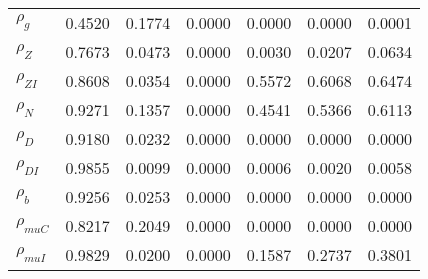 \begin{center}
\begin{longtable}{lcccccc}
$ {\rho_g}             $	 & 	          0.4520	 & 	          0.1774	 & 	          0.0000	 & 	          0.0000	 & 	          0.0000	 & 	          0.0001 \\ 
$ {\rho_Z}             $	 & 	          0.7673	 & 	          0.0473	 & 	          0.0000	 & 	          0.0030	 & 	          0.0207	 & 	          0.0634 \\ 
$ {\rho_{ZI}}          $	 & 	          0.8608	 & 	          0.0354	 & 	          0.0000	 & 	          0.5572	 & 	          0.6068	 & 	          0.6474 \\ 
$ {\rho_N}             $	 & 	          0.9271	 & 	          0.1357	 & 	          0.0000	 & 	          0.4541	 & 	          0.5366	 & 	          0.6113 \\ 
$ {\rho_D}             $	 & 	          0.9180	 & 	          0.0232	 & 	          0.0000	 & 	          0.0000	 & 	          0.0000	 & 	          0.0000 \\ 
$ {\rho_{DI}}          $	 & 	          0.9855	 & 	          0.0099	 & 	          0.0000	 & 	          0.0006	 & 	          0.0020	 & 	          0.0058 \\ 
$ {\rho_b}             $	 & 	          0.9256	 & 	          0.0253	 & 	          0.0000	 & 	          0.0000	 & 	          0.0000	 & 	          0.0000 \\ 
$ {\rho_{muC}}         $	 & 	          0.8217	 & 	          0.2049	 & 	          0.0000	 & 	          0.0000	 & 	          0.0000	 & 	          0.0000 \\ 
$ {\rho_{muI}}         $	 & 	          0.9829	 & 	          0.0200	 & 	          0.0000	 & 	          0.1587	 & 	          0.2737	 & 	          0.3801 \\ 
\end{longtable}
 \end{center}
